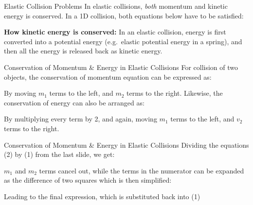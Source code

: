 \documentclass[12pt,compress,aspectratio=169]{beamer}
\begin{document}
\begin{frame}{Elastic Collision Problems}
  In elastic collisions, \emph{both} momentum and kinetic energy is conserved.
  In a 1D collision, both equations below have to be satisfied:

  \vspace{-.2in}{\Large
    \begin{align*}
      \sum m_iv_i&=\sum m_iv_i'\\
      \sum\frac12 m_iv_i^2&=\sum\frac12 m_iv_i'^2
    \end{align*}
  }

  \textbf{How kinetic energy is conserved:} In an elastic collision, energy is
  first converted into a potential energy (e.g.\ elastic potential energy in a
  spring), and then all the energy is released back as kinetic energy.
\end{frame}



\begin{frame}{Conservation of Momentum \& Energy in Elastic Collisions}
  For collision of two objects, the conservation of momentum equation can be
  expressed as:


  By moving $m_1$ terms to the left, and $m_2$ terms to the right. Likewise,
  the conservation of energy can also be arranged as:


  By multiplying every term by \num{2}, and again, moving $m_1$ terms to the
  left, and $v_2$ terms to the right.
\end{frame}



\begin{frame}{Conservation of Momentum \& Energy in Elastic Collisions}
  Dividing the equations (2) by (1) from the last slide, we get:

  

  $m_1$ and $m_2$ terms cancel out, while the terms in the numerator can be
  expanded as the difference of two squares which is then simplified:

  
  Leading to the final expression, which is substituted back into (1)
  

\end{frame}
\end{document}
